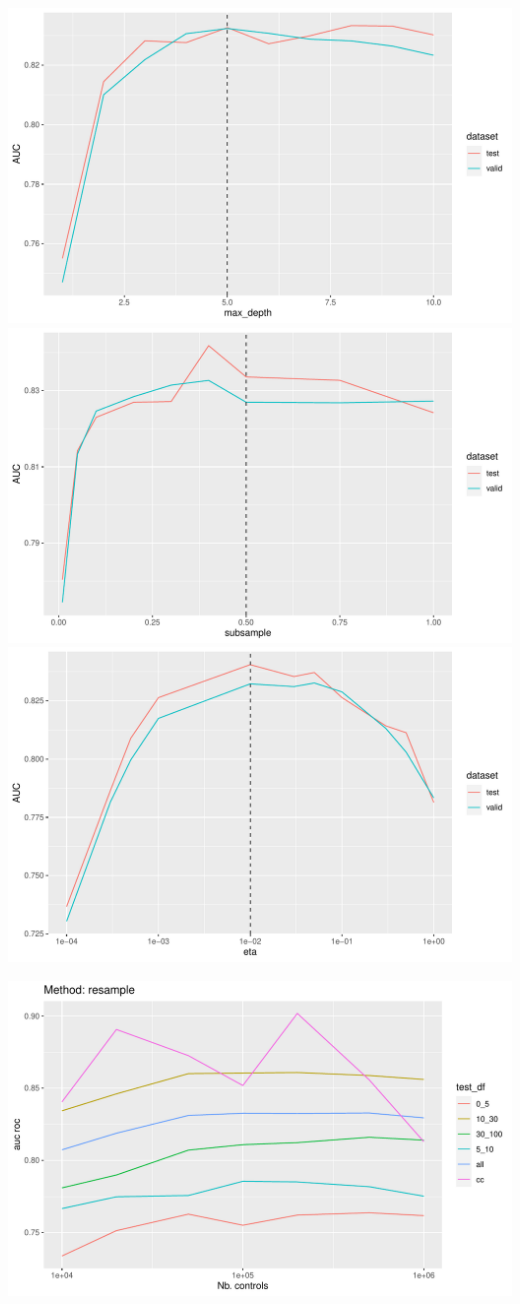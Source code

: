 \documentclass[12pt]{article}
\begin{document}
\pagebreak
\begin{center}
\includegraphics[width=.7\textwidth]{best_aucs_tuning_max_depth.pdf}
\includegraphics[width=.7\textwidth]{best_aucs_tuning_subsample.pdf}
\includegraphics[width=.7\textwidth]{best_aucs_tuning_eta.pdf}
\end{center}


\pagebreak
\begin{center}
\includegraphics[width=.9\textwidth]{size_resample_roc.pdf}
\end{center}
\end{document}
